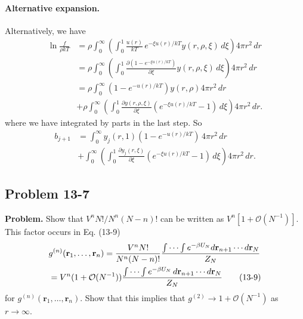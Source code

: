 \documentclass[twocolumn, 10pt]{article}
\numberwithin{equation}{section}
\newenvironment{problem}
{\par\medskip \color{problemblue}
  \textbf{Problem. }\ignorespaces}
{\medskip}
\newenvironment{solution}[1][\empty]
{\par\medskip\sffamily
  \textbf{\ifx\empty#1{Solution.}\relax\else{#1}\fi} \ignorespaces}
{\medskip}
\begin{document}
\begin{solution}
\paragraph*{Alternative expansion.}

  Alternatively,
  we have
  \begin{align*}
    \ln \frac{ f } { \rho k T }
    &=
    \rho
    \int_0^\infty
    \left(
      \int_0^1
      \frac{u(r)} {kT} \, e^{-\xi u(r)/kT}
      y(r, \rho, \xi) \, d\xi \right)
     4 \pi r^2 \, dr
    \\
    &=
    \rho
    \int_0^\infty
    \left(
      \int_0^1
      \frac{ \partial (1 - e^{-\xi u(r)/kT}) } { \partial \xi }
      y(r, \rho, \xi) \, d\xi
    \right)
     4 \pi r^2 \, dr
    \\
    &=
    \rho
    \int_0^\infty
      (1 - e^{-u(r)/kT})
      y(r, \rho)
     4 \pi r^2 \, dr
    \\
    &+\rho
    \int_0^\infty
    \left(
      \int_0^1
      \frac{ \partial y(r, \rho, \xi) } { \partial \xi}
      (e^{-\xi u(r)/kT} - 1)
      \, d\xi \right)
     4 \pi r^2 \, dr
    .
  \end{align*}
  where we have integrated by parts in the last step.
  So
  \begin{align*}
    b_{j+1}
    &=
    \int_0^\infty
      y_j(r, 1) (1 - e^{-u(r)/kT})
      \, 4 \pi r^2 \, dr
    \\
    &+
    \int_0^\infty
      \left(
        \int_0^1 \frac{ \partial y_j(r, \xi) } { \partial \xi}
        (e^{-\xi u(r)/kT} - 1) \, d\xi
      \right)
    4 \pi r^2 \, dr
    .
  \end{align*}
\end{solution}


\subsection{Problem 13-7}

\begin{problem}
  Show that $V^n N! / N^n (N-n)!$
  can be written as $V^n[1 + \mathcal O(N^{-1})]$.
  This factor occurs in Eq. (13-9)
  \begin{align}
    &g^{(n)}(\mathbf r_1, \dots, \mathbf r_n)
    =
    \frac{ V^n N! } { N^n (N-n)! }
    \frac{
      \int\cdots\int e^{-\beta U_N} d\mathbf r_{n+1}\cdots d\mathbf r_N
    } { Z_N }
    \notag
    \\
    &=
    V^n(1 + \mathcal O(N^{-1}))
    \frac{
      \int\cdots\int e^{-\beta U_N} \, d\mathbf r_{n+1}\cdots d\mathbf r_N
    } { Z_N }
    \label{eq:gn_def}
    \tag{13-9}
  \end{align}
  for $g^{(n)}(\mathbf r_1, \dots, \mathbf r_n)$.
  Show that this implies that
  $g^{(2)} \to 1 + \mathcal O(N^{-1})$ as $r \to \infty$.
\end{problem}
\end{document}
